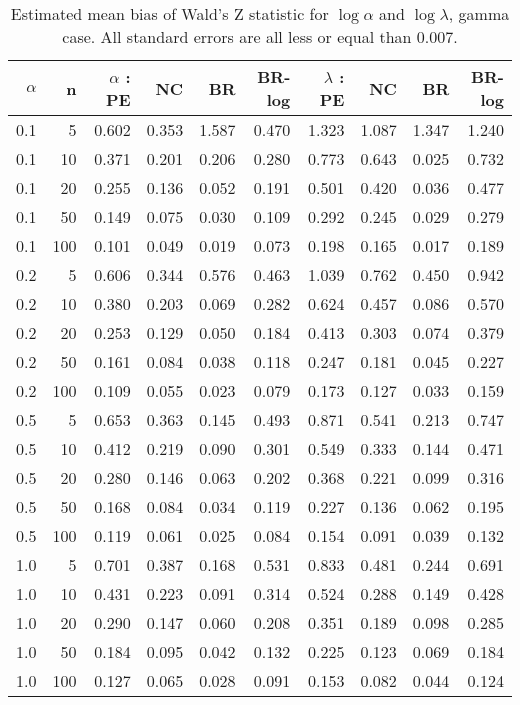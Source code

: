 \begin{table}

\caption{\label{tab:esgammabias}Estimated mean bias of Wald's Z statistic for $\log\alpha$ and $\log\lambda$, gamma case. All standard errors are all less or equal than $0.007$.}
\centering
\begin{tabular}[t]{rr|rrrr|rrrr}
\toprule
$\alpha$ & n & $\alpha$ : PE & NC & BR & BR-log & $\lambda$ : PE &  NC &  BR &  BR-log\\
\midrule
0.1 & 5 & 0.602 & 0.353 & 1.587 & 0.470 & 1.323 & 1.087 & 1.347 & 1.240\\
0.1 & 10 & 0.371 & 0.201 & 0.206 & 0.280 & 0.773 & 0.643 & 0.025 & 0.732\\
0.1 & 20 & 0.255 & 0.136 & 0.052 & 0.191 & 0.501 & 0.420 & 0.036 & 0.477\\
0.1 & 50 & 0.149 & 0.075 & 0.030 & 0.109 & 0.292 & 0.245 & 0.029 & 0.279\\
0.1 & 100 & 0.101 & 0.049 & 0.019 & 0.073 & 0.198 & 0.165 & 0.017 & 0.189\\

0.2 & 5 & 0.606 & 0.344 & 0.576 & 0.463 & 1.039 & 0.762 & 0.450 & 0.942\\
0.2 & 10 & 0.380 & 0.203 & 0.069 & 0.282 & 0.624 & 0.457 & 0.086 & 0.570\\
0.2 & 20 & 0.253 & 0.129 & 0.050 & 0.184 & 0.413 & 0.303 & 0.074 & 0.379\\
0.2 & 50 & 0.161 & 0.084 & 0.038 & 0.118 & 0.247 & 0.181 & 0.045 & 0.227\\
0.2 & 100 & 0.109 & 0.055 & 0.023 & 0.079 & 0.173 & 0.127 & 0.033 & 0.159\\

0.5 & 5 & 0.653 & 0.363 & 0.145 & 0.493 & 0.871 & 0.541 & 0.213 & 0.747\\
0.5 & 10 & 0.412 & 0.219 & 0.090 & 0.301 & 0.549 & 0.333 & 0.144 & 0.471\\
0.5 & 20 & 0.280 & 0.146 & 0.063 & 0.202 & 0.368 & 0.221 & 0.099 & 0.316\\
0.5 & 50 & 0.168 & 0.084 & 0.034 & 0.119 & 0.227 & 0.136 & 0.062 & 0.195\\
0.5 & 100 & 0.119 & 0.061 & 0.025 & 0.084 & 0.154 & 0.091 & 0.039 & 0.132\\

1.0 & 5 & 0.701 & 0.387 & 0.168 & 0.531 & 0.833 & 0.481 & 0.244 & 0.691\\
1.0 & 10 & 0.431 & 0.223 & 0.091 & 0.314 & 0.524 & 0.288 & 0.149 & 0.428\\
1.0 & 20 & 0.290 & 0.147 & 0.060 & 0.208 & 0.351 & 0.189 & 0.098 & 0.285\\
1.0 & 50 & 0.184 & 0.095 & 0.042 & 0.132 & 0.225 & 0.123 & 0.069 & 0.184\\
1.0 & 100 & 0.127 & 0.065 & 0.028 & 0.091 & 0.153 & 0.082 & 0.044 & 0.124\\


\end{tabular}
\end{table}
